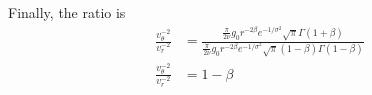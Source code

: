 Finally, the ratio is
\begin{align*}
    \frac{v^{-2}_\theta}{v^{-2}_r}&=\frac{\frac{\pi}{2\nu}g_0r^{-2\beta}e^{-1/\sigma^2}\sqrt{\pi}\Gamma\left(1+\beta\right)}{\frac{\pi}{2\nu}g_0r^{-2\beta}e^{-1/\sigma^2}\sqrt{\pi}(1-\beta)\Gamma\left(1-\beta\right)}\\
    \frac{v^{-2}_\theta}{v^{-2}_r}&=1-\beta\\
\end{align*}


\subsection{}



